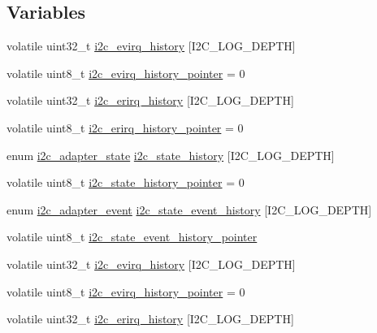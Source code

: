 \subsection*{\-Variables}
\begin{DoxyCompactItemize}
\item 
volatile uint32\-\_\-t \hyperlink{group___p_i_o_s___i2_c_ga958ee525a13dda424039275af66ad3ce}{i2c\-\_\-evirq\-\_\-history} \mbox{[}\-I2\-C\-\_\-\-L\-O\-G\-\_\-\-D\-E\-P\-T\-H\mbox{]}
\item 
volatile uint8\-\_\-t \hyperlink{group___p_i_o_s___i2_c_gadf5676851d3bae320be666713dd5cb95}{i2c\-\_\-evirq\-\_\-history\-\_\-pointer} = 0
\item 
volatile uint32\-\_\-t \hyperlink{group___p_i_o_s___i2_c_ga682906503c30ce6f539ac8f7628346f8}{i2c\-\_\-erirq\-\_\-history} \mbox{[}\-I2\-C\-\_\-\-L\-O\-G\-\_\-\-D\-E\-P\-T\-H\mbox{]}
\item 
volatile uint8\-\_\-t \hyperlink{group___p_i_o_s___i2_c_ga0593115613cf2d368fe6dbe7b4e5dcff}{i2c\-\_\-erirq\-\_\-history\-\_\-pointer} = 0
\item 
enum \hyperlink{pios__i2c__priv_8h_ac73b69ffe53544057fa2e4751fd9c22b}{i2c\-\_\-adapter\-\_\-state} \hyperlink{group___p_i_o_s___i2_c_ga207839e0ce4c1011c30ea9254657251c}{i2c\-\_\-state\-\_\-history} \mbox{[}\-I2\-C\-\_\-\-L\-O\-G\-\_\-\-D\-E\-P\-T\-H\mbox{]}
\item 
volatile uint8\-\_\-t \hyperlink{group___p_i_o_s___i2_c_gad02d69a4953e925d905e000697a0d885}{i2c\-\_\-state\-\_\-history\-\_\-pointer} = 0
\item 
enum \hyperlink{group___p_i_o_s___i2_c_ga2a8f77797f5dbd873514e92d3d043649}{i2c\-\_\-adapter\-\_\-event} \hyperlink{group___p_i_o_s___i2_c_gad2fddef6926d27512901cbe84b7b99bd}{i2c\-\_\-state\-\_\-event\-\_\-history} \mbox{[}\-I2\-C\-\_\-\-L\-O\-G\-\_\-\-D\-E\-P\-T\-H\mbox{]}
\item 
volatile uint8\-\_\-t \hyperlink{group___p_i_o_s___i2_c_gabdb9d9357371d1ece20779da0d69d27b}{i2c\-\_\-state\-\_\-event\-\_\-history\-\_\-pointer}
\item 
volatile uint32\-\_\-t \hyperlink{group___p_i_o_s___i2_c_ga958ee525a13dda424039275af66ad3ce}{i2c\-\_\-evirq\-\_\-history} \mbox{[}\-I2\-C\-\_\-\-L\-O\-G\-\_\-\-D\-E\-P\-T\-H\mbox{]}
\item 
volatile uint8\-\_\-t \hyperlink{group___p_i_o_s___i2_c_gadf5676851d3bae320be666713dd5cb95}{i2c\-\_\-evirq\-\_\-history\-\_\-pointer} = 0
\item 
volatile uint32\-\_\-t \hyperlink{group___p_i_o_s___i2_c_ga682906503c30ce6f539ac8f7628346f8}{i2c\-\_\-erirq\-\_\-history} \mbox{[}\-I2\-C\-\_\-\-L\-O\-G\-\_\-\-D\-E\-P\-T\-H\mbox{]}

\end{DoxyCompactItemize}
